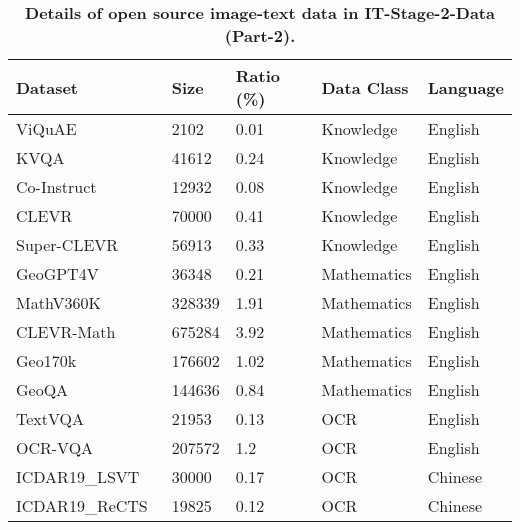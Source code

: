 \begin{table}[h]
\centering
\caption{\textbf{Details of open source image-text data in IT-Stage-2-Data (Part-2).}
}
\label{tab:appendix_sft_s2_it_2}
\setlength{\tabcolsep}{7pt}
\begin{tabular}{l|l|l|l|l}
\toprule
Dataset                         & Size    & Ratio (\%) & Data Class    & Language        \\
\midrule
ViQuAE~\cite{lerner2022viquae}                     & 2102   & 0.01       & Knowledge    & English         \\
KVQA~\cite{shah2019kvqa}                           & 41612  & 0.24       & Knowledge    & English         \\
Co-Instruct~\cite{wu2024openended}                 & 12932  & 0.08       & Knowledge    & English         \\
CLEVR~\cite{johnson2017clevr}                      & 70000  & 0.41       & Knowledge    & English         \\
Super-CLEVR~\cite{li2023super}                     & 56913  & 0.33       & Knowledge    & English         \\
GeoGPT4V~\cite{cai2024geogpt4v}                    & 36348  & 0.21       & Mathematics  & English         \\
MathV360K~\cite{shi2024math}                       & 328339 & 1.91       & Mathematics  & English         \\
CLEVR-Math~\cite{lindstrom2022clevr}               & 675284 & 3.92       & Mathematics  & English         \\
Geo170k~\cite{gao2023g}                            & 176602 & 1.02       & Mathematics  & English         \\
GeoQA~\cite{chen2022geoqa}                         & 144636 & 0.84       & Mathematics  & English         \\
TextVQA~\cite{singh2019towards}                    & 21953  & 0.13       & OCR          & English         \\
OCR-VQA~\cite{mishra2019ocr}                       & 207572 & 1.2        & OCR          & English         \\
ICDAR19\_LSVT~\cite{sun2019icdar}             & 30000  & 0.17       & OCR          & Chinese         \\
ICDAR19\_ReCTS~\cite{zhang2019icdar}          & 19825  & 0.12       & OCR          & Chinese         \\

\end{tabular}
\end{table}

